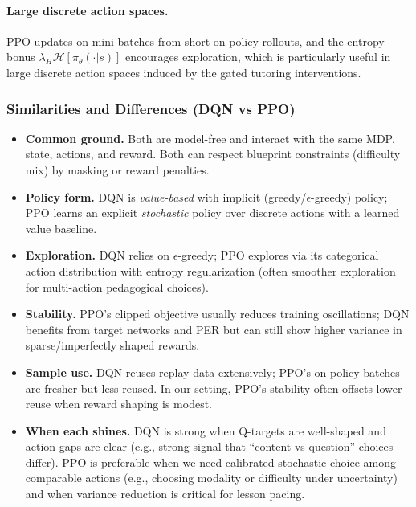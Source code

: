 \documentclass[preprint,12pt]{elsarticle}
\begin{document}
\begin{frontmatter}
\paragraph{Large discrete action spaces.}
PPO updates on mini-batches from short on-policy rollouts, and the entropy bonus $\lambda_H \mathcal{H}[\pi_\theta(\cdot|s)]$ encourages exploration, which is particularly useful in large discrete action spaces induced by the gated tutoring interventions.


\subsubsection*{Similarities and Differences (DQN vs PPO)}
\begin{itemize}
  \item \textbf{Common ground.} Both are model-free and interact with the same MDP, state, actions, and reward. Both can respect blueprint constraints (difficulty mix) by masking or reward penalties.
  \item \textbf{Policy form.} DQN is \emph{value-based} with implicit (greedy/$\epsilon$-greedy) policy; PPO learns an explicit \emph{stochastic} policy over discrete actions with a learned value baseline.
  \item \textbf{Exploration.} DQN relies on $\epsilon$-greedy; PPO explores via its categorical action distribution with entropy regularization (often smoother exploration for multi-action pedagogical choices).
  \item \textbf{Stability.} PPO’s clipped objective usually reduces training oscillations; DQN benefits from target networks and PER but can still show higher variance in sparse/imperfectly shaped rewards.
  \item \textbf{Sample use.} DQN reuses replay data extensively; PPO’s on-policy batches are fresher but less reused. In our setting, PPO’s stability often offsets lower reuse when reward shaping is modest.
  \item \textbf{When each shines.} 
  DQN is strong when Q-targets are well-shaped and action gaps are clear (e.g., strong signal that “content vs question” choices differ).
  PPO is preferable when we need calibrated stochastic choice among comparable actions (e.g., choosing modality or difficulty under uncertainty) and when variance reduction is critical for lesson pacing.
\end{itemize}


\end{frontmatter}
\end{document}
